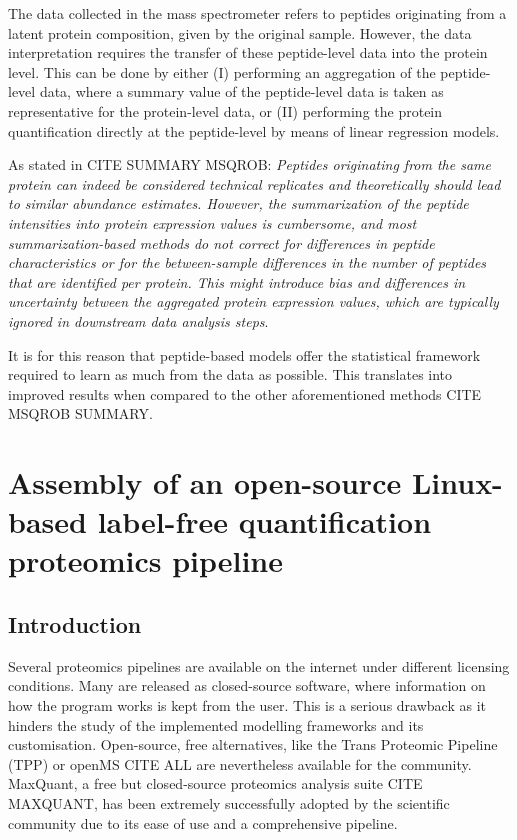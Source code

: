 \documentclass[11pt, a4paper]{report}
\begin{document}
The data collected in the mass spectrometer refers to peptides originating from a latent protein composition, given by the original sample. However, the data interpretation requires the transfer of these peptide-level data into the protein level. This can be done by either (I) performing an aggregation of the peptide-level data, where a summary value of the peptide-level data is taken as representative for the protein-level data, or (II) performing the protein quantification directly at the peptide-level by means of linear regression models.

As stated in  CITE SUMMARY MSQROB: \textit{Peptides originating from the same protein can indeed be considered technical replicates and theoretically should lead to similar abundance estimates. However, the summarization of the peptide intensities into protein expression values is cumbersome, and most summarization-based methods do not correct for differences in peptide characteristics or for the between-sample differences in the number of peptides that are identified per protein. This might introduce bias and differences in uncertainty between the aggregated protein expression values, which are typically ignored in downstream data analysis steps}.

It is for this reason that peptide-based models offer the statistical framework required to learn as much from the data as possible. This translates into improved results when compared to the other aforementioned methods CITE MSQROB SUMMARY.

%


\chapter{Assembly of an open-source Linux-based label-free quantification proteomics pipeline}
\label{chap:pipeline}

\section{Introduction}

Several proteomics pipelines are available on the internet under different licensing conditions. Many are released as closed-source software, where information on how the program works is kept from the user. This is a serious drawback as it hinders the study of the implemented modelling frameworks and its customisation. Open-source, free alternatives, like the Trans Proteomic Pipeline (\ac{TPP}) or openMS  CITE ALL are nevertheless available for the community. MaxQuant, a free but closed-source proteomics analysis suite CITE MAXQUANT, has been extremely successfully adopted by the scientific community due to its ease of use and a comprehensive pipeline.
\end{document}
